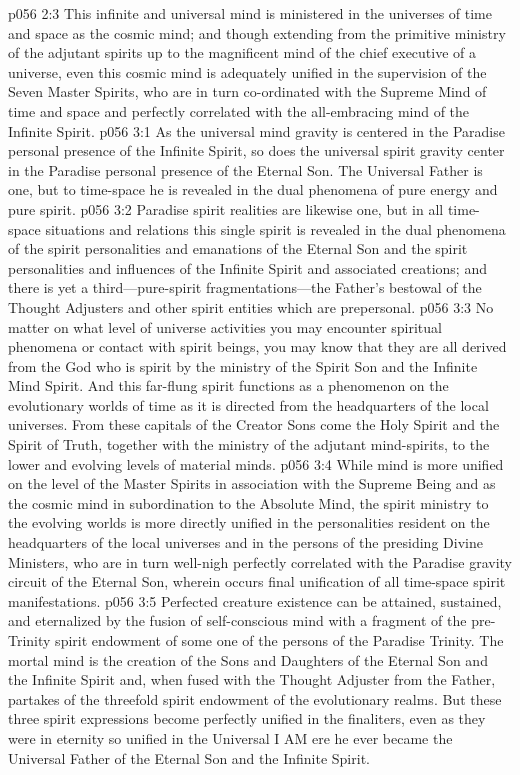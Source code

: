 \vs p056 2:3 This infinite and universal mind is ministered in the universes of time and space as the cosmic mind; and though extending from the primitive ministry of the adjutant spirits up to the magnificent mind of the chief executive of a universe, even this cosmic mind is adequately unified in the supervision of the Seven Master Spirits, who are in turn co\hyp{}ordinated with the Supreme Mind of time and space and perfectly correlated with the all\hyp{}embracing mind of the Infinite Spirit.\plusone
{}
\vs p056 3:1 As the universal mind gravity is centered in the Paradise personal presence of the Infinite Spirit, so does the universal spirit gravity center in the Paradise personal presence of the Eternal Son. The Universal Father is one, but to time\hyp{}space he is revealed in the dual phenomena of pure energy and pure spirit.
\vs p056 3:2 Paradise spirit realities are likewise one, but in all time\hyp{}space situations and relations this single spirit is revealed in the dual phenomena of the spirit personalities and emanations of the Eternal Son and the spirit personalities and influences of the Infinite Spirit and associated creations; and there is yet a third---pure\hyp{}spirit fragmentations---the Father’s bestowal of the Thought Adjusters and other spirit entities which are prepersonal.
\pc \vs p056 3:3 No matter on what level of universe activities you may encounter spiritual phenomena or contact with spirit beings, you may know that they are all derived from the God who is spirit by the ministry of the Spirit Son and the Infinite Mind Spirit. And this far\hyp{}flung spirit functions as a phenomenon on the evolutionary worlds of time as it is directed from the headquarters of the local universes. From these capitals of the Creator Sons come the Holy Spirit and the Spirit of Truth, together with the ministry of the adjutant mind\hyp{}spirits, to the lower and evolving levels of material minds.
\vs p056 3:4 While mind is more unified on the level of the Master Spirits in association with the Supreme Being and as the cosmic mind in subordination to the Absolute Mind, the spirit ministry to the evolving worlds is more directly unified in the personalities resident on the headquarters of the local universes and in the persons of the presiding Divine Ministers, who are in turn well\hyp{}nigh perfectly correlated with the Paradise gravity circuit of the Eternal Son, wherein occurs final unification of all time\hyp{}space spirit manifestations.
\pc \vs p056 3:5 Perfected creature existence can be attained, sustained, and eternalized by the fusion of self\hyp{}conscious mind with a fragment of the pre\hyp{}Trinity spirit endowment of some one of the persons of the Paradise Trinity. The mortal mind is the creation of the Sons and Daughters of the Eternal Son and the Infinite Spirit and, when fused with the Thought Adjuster from the Father, partakes of the threefold spirit endowment of the evolutionary realms. But these three spirit expressions become perfectly unified in the finaliters, even as they were in eternity so unified in the Universal I AM ere he ever became the Universal Father of the Eternal Son and the Infinite Spirit.
